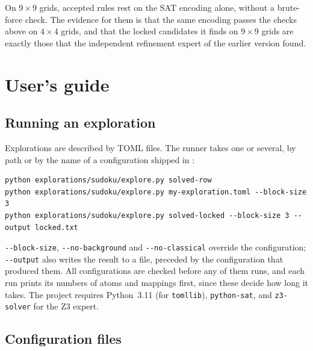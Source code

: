\documentclass[11pt,a4paper]{article}
\theoremstyle{definition}
\theoremstyle{remark}
\newcommand{\code}[1]{\texttt{#1}}
\begin{document}
On $9 \times 9$ grids, accepted rules rest on the SAT encoding alone, without a brute-force check. The evidence for them is that the same encoding passes the checks above on $4 \times 4$ grids, and that the locked candidates it finds on $9 \times 9$ grids are exactly those that the independent refinement expert of the earlier version found.

\section{User's guide}\label{sec:guide}

\subsection{Running an exploration}

Explorations are described by TOML files. The runner takes one or several, by path or by the name of a configuration shipped in :
\begin{Verbatim}
python explorations/sudoku/explore.py solved-row
python explorations/sudoku/explore.py my-exploration.toml --block-size 3
python explorations/sudoku/explore.py solved-locked --block-size 3 --output locked.txt
\end{Verbatim}
\code{-{}-block-size}, \code{-{}-no-background} and \code{-{}-no-classical} override the configuration; \code{-{}-output} also writes the result to a file, preceded by the configuration that produced them. All configurations are checked before any of them runs, and each run prints its numbers of atoms and mappings first, since these decide how long it takes. The project requires Python~3.11 (for \code{tomllib}), \code{python-sat}, and \code{z3-solver} for the Z3 expert.

\subsection{Configuration files}
\end{document}
